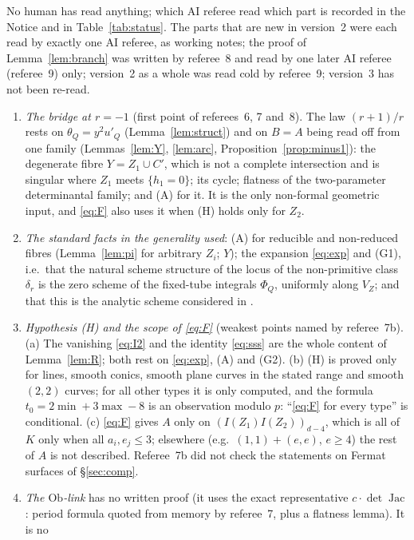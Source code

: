 \documentclass[11pt]{article}
\numberwithin{equation}{section}
\theoremstyle{remark}
\newcommand{\VZ}{V_Z}
\newcommand{\Ob}{\mathrm{Ob}}
\begin{document}
No human has read anything; which AI referee read which part is recorded in the Notice and in
Table~\ref{tab:status}. The parts that are new in version~2 were each read by exactly one AI referee, as working
notes; the proof of Lemma~\ref{lem:branch} was written by referee~8 and read by one later AI referee (referee~9)
only; version~2 as a whole was read cold by referee~9; version~3 has not been re-read.
\begin{enumerate}[label=\textup{(\arabic*)}]
\item \emph{The bridge at $r=-1$} (first point of referees~6, 7 and~8). The law $(r+1)/r$ rests on
$\theta_Q=y^2u'_Q$ (Lemma~\ref{lem:struct}) and on $B=A$ being read off from one family
(Lemmas~\ref{lem:Y}, \ref{lem:arc}, Proposition~\ref{prop:minus1}): the degenerate fibre $Y=Z_1\cup C'$, which is
not a complete intersection and is singular where $Z_1$ meets $\{h_1=0\}$; its cycle; flatness of the
two-parameter determinantal family; and (A) for it. It is the only non-formal geometric input, and
\eqref{eq:F} also uses it when (H) holds only for $Z_2$.
\item \emph{The standard facts in the generality used}: (A) for reducible and non-reduced fibres
(Lemma~\ref{lem:pi} for arbitrary $Z_i$; $Y$); the expansion \eqref{eq:exp} and (G1), i.e.\ that the natural
scheme structure of the locus of the non-primitive class $\delta_r$ is the zero scheme of the fixed-tube
integrals $\Phi_Q$, uniformly along $\VZ$; and that this is the analytic scheme considered in \cite{Mo26}.
\item \emph{Hypothesis \textup{(H)} and the scope of \eqref{eq:F}} (weakest points named by referee~7b).
(a) The vanishing \eqref{eq:I2} and the identity \eqref{eq:sss} are the whole content of Lemma~\ref{lem:R};
both rest on \eqref{eq:exp}, (A) and (G2). (b) (H) is proved only for lines, smooth conics, smooth plane curves
in the stated range and smooth $(2,2)$ curves; for all other types it is only computed, and the formula
$t_0=2\min+3\max-8$ is an observation modulo $p$: ``\eqref{eq:F} for every type'' is conditional. (c)
\eqref{eq:F} gives $A$ only on $(I(Z_1)I(Z_2))_{d-4}$, which is all of $K$ only when all $a_i,e_j\le3$; elsewhere
(e.g.\ $(1,1)+(e,e)$, $e\ge4$) the rest of $A$ is not described. Referee~7b did not check the statements on
Fermat surfaces of \S\ref{sec:comp}.
\item \emph{The $\Ob$-link} has no written proof (it uses the exact representative
$c\cdot\det\operatorname{Jac}$: period formula quoted from memory by referee~7, plus a flatness lemma). It is no

\end{enumerate}
\end{document}
